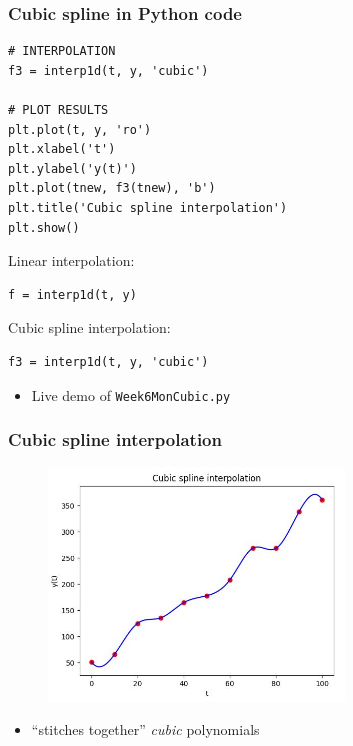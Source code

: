 \documentclass[english,14pt]{beamer}
\begin{document}

\begin{frame}[fragile]

\frametitle{Cubic spline in Python code}

\begin{lstlisting}[style=CStyle,basicstyle=\scriptsize]
# INTERPOLATION
f3 = interp1d(t, y, 'cubic')

# PLOT RESULTS
plt.plot(t, y, 'ro')
plt.xlabel('t')
plt.ylabel('y(t)')
plt.plot(tnew, f3(tnew), 'b')
plt.title('Cubic spline interpolation')
plt.show()
\end{lstlisting}

Linear interpolation:
\begin{lstlisting}[style=CStyle,basicstyle=\small]
f = interp1d(t, y)
\end{lstlisting}

Cubic spline interpolation:
\begin{lstlisting}[style=CStyle,basicstyle=\small]
f3 = interp1d(t, y, 'cubic')
\end{lstlisting}

\begin{itemize}
	\item Live demo of \texttt{Week6MonCubic.py}
\end{itemize}

\end{frame}


\begin{frame}[fragile]

\frametitle{Cubic spline interpolation}

\vspace*{-3mm}
\begin{figure}[ht]
	\centering
	\includegraphics[width=0.7\textwidth]{figures/Week6MonCubicSpline}
\end{figure}
\vspace*{-5mm}
\begin{itemize}
	\item ``stitches together'' \emph{cubic} polynomials
\end{itemize}

\end{frame}
\end{document}
